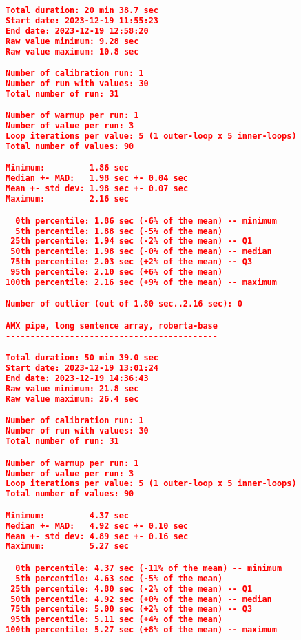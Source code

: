 \begin{lstlisting}[language=json]
Total duration: 20 min 38.7 sec
Start date: 2023-12-19 11:55:23
End date: 2023-12-19 12:58:20
Raw value minimum: 9.28 sec
Raw value maximum: 10.8 sec

Number of calibration run: 1
Number of run with values: 30
Total number of run: 31

Number of warmup per run: 1
Number of value per run: 3
Loop iterations per value: 5 (1 outer-loop x 5 inner-loops)
Total number of values: 90

Minimum:         1.86 sec
Median +- MAD:   1.98 sec +- 0.04 sec
Mean +- std dev: 1.98 sec +- 0.07 sec
Maximum:         2.16 sec

  0th percentile: 1.86 sec (-6% of the mean) -- minimum
  5th percentile: 1.88 sec (-5% of the mean)
 25th percentile: 1.94 sec (-2% of the mean) -- Q1
 50th percentile: 1.98 sec (-0% of the mean) -- median
 75th percentile: 2.03 sec (+2% of the mean) -- Q3
 95th percentile: 2.10 sec (+6% of the mean)
100th percentile: 2.16 sec (+9% of the mean) -- maximum

Number of outlier (out of 1.80 sec..2.16 sec): 0

AMX pipe, long sentence array, roberta-base
-------------------------------------------

Total duration: 50 min 39.0 sec
Start date: 2023-12-19 13:01:24
End date: 2023-12-19 14:36:43
Raw value minimum: 21.8 sec
Raw value maximum: 26.4 sec

Number of calibration run: 1
Number of run with values: 30
Total number of run: 31

Number of warmup per run: 1
Number of value per run: 3
Loop iterations per value: 5 (1 outer-loop x 5 inner-loops)
Total number of values: 90

Minimum:         4.37 sec
Median +- MAD:   4.92 sec +- 0.10 sec
Mean +- std dev: 4.89 sec +- 0.16 sec
Maximum:         5.27 sec

  0th percentile: 4.37 sec (-11% of the mean) -- minimum
  5th percentile: 4.63 sec (-5% of the mean)
 25th percentile: 4.80 sec (-2% of the mean) -- Q1
 50th percentile: 4.92 sec (+0% of the mean) -- median
 75th percentile: 5.00 sec (+2% of the mean) -- Q3
 95th percentile: 5.11 sec (+4% of the mean)
100th percentile: 5.27 sec (+8% of the mean) -- maximum
\end{lstlisting}

